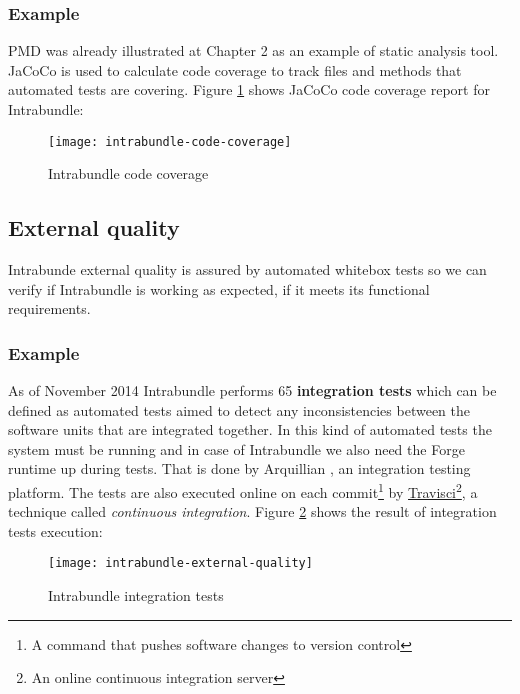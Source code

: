 \subsubsection{Example}
 PMD was already illustrated at Chapter 2 as an example of static analysis tool. JaCoCo is used to calculate code coverage to track files and methods that automated tests are covering. Figure \ref{intrabundle-code-cover} shows JaCoCo code coverage report for Intrabundle:

\begin{figure}[h]
\caption{Intrabundle code coverage}
\label{intrabundle-code-cover}
\texttt{[image: intrabundle-code-coverage]}
\end{figure}

\FloatBarrier
\newpage
\subsection{External quality}
Intrabunde external quality is assured by automated whitebox tests so we can verify if Intrabundle is working as expected, if it meets its functional requirements.

\subsubsection{Example}
As of November 2014 Intrabundle performs 65 \textbf{integration tests} which can be defined as automated tests aimed to detect any inconsistencies between the software units that are integrated together. In this kind of automated tests the system must be running and in case of Intrabundle we also need the Forge runtime up during tests. That is done by Arquillian \citep{dan 2011}, an integration testing platform. The tests are also executed online on each commit\footnote{A command that pushes software changes to version control} by \href{https://travis-ci.org/rmpestano/intrabundle}{Travisci}\footnote{An online continuous integration server}, a technique called \emph{continuous integration}. Figure \ref{intrabundle-integ-tests} shows the result of integration tests execution:

\begin{figure}[h]
\caption{Intrabundle integration tests}
\label{intrabundle-integ-tests}
\texttt{[image: intrabundle-external-quality]}
\centering
\end{figure}

\FloatBarrier